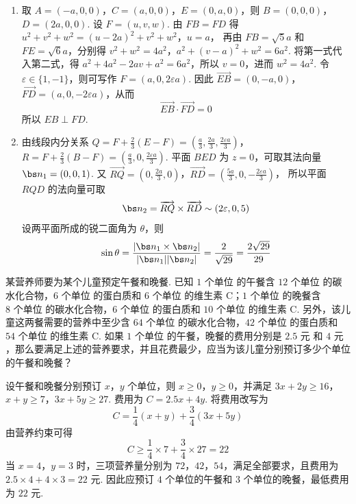 \begin{solution}
\begin{enumerate}
\item 取 \(A=(-a,0,0)\)，\(C=(a,0,0)\)，\(E=(0,a,0)\)，则 \(B=(0,0,0)\)，\(D=(2a,0,0)\). 设 \(F=(u,v,w)\). 由 \(FB=FD\) 得
\(u^2+v^2+w^2=(u-2a)^2+v^2+w^2\)，\(u=a\)，
再由 \(FB=\sqrt5a\) 和 \(FE=\sqrt6a\)，分别得
\(v^2+w^2=4a^2\)，\(a^2+(v-a)^2+w^2=6a^2\).
将第一式代入第二式，得 \(a^2+4a^2-2av+a^2=6a^2\)，所以 \(v=0\)，进而 \(w^2=4a^2\). 令 \(\varepsilon\in\{1,-1\}\)，则可写作 \(F=(a,0,2\varepsilon a)\). 因此 \(\overrightarrow{EB}=(0,-a,0)\)，\(\overrightarrow{FD}=(a,0,-2\varepsilon a)\)，从而
\[
\overrightarrow{EB}\cdot\overrightarrow{FD}=0
\]
所以 \(EB\perp FD\).
\item 由线段内分关系
\(Q=F+\frac23(E-F)=\left(\frac a3,\frac{2a}{3},\frac{2\varepsilon a}{3}\right)\)，\(R=F+\frac23(B-F)=\left(\frac a3,0,\frac{2\varepsilon a}{3}\right)\).
平面 \(BED\) 为 \(z=0\)，可取其法向量 \(\bs n_1=(0,0,1)\). 又
\(\overrightarrow{RQ}=(0,\tfrac{2a}{3},0)\)，\(\overrightarrow{RD}=(\tfrac{5a}{3},0,-\tfrac{2\varepsilon a}{3})\)，
所以平面 \(RQD\) 的法向量可取
\[
\bs n_2=\overrightarrow{RQ}\times\overrightarrow{RD}\sim(2\varepsilon,0,5)
\]
设两平面所成的锐二面角为 \(\theta\)，则
\[
\sin\theta=\frac{|\bs n_1\times\bs n_2|}{|\bs n_1||\bs n_2|}=\frac2{\sqrt{29}}=\frac{2\sqrt{29}}{29}
\]
\end{enumerate}
\end{solution}

\begin{problem}
某营养师要为某个儿童预定午餐和晚餐. 已知 \(1\text{ 个单位}\) 的午餐含 \(12\text{ 个单位}\) 的碳水化合物，\(6\text{ 个单位}\) 的蛋白质和 \(6\text{ 个单位}\) 的维生素 \(\mathrm C\)；\(1\text{ 个单位}\) 的晚餐含 \(8\text{ 个单位}\) 的碳水化合物，\(6\text{ 个单位}\) 的蛋白质和 \(10\text{ 个单位}\) 的维生素 \(\mathrm C\). 另外，该儿童这两餐需要的营养中至少含 \(64\text{ 个单位}\) 的碳水化合物，\(42\text{ 个单位}\) 的蛋白质和 \(54\text{ 个单位}\) 的维生素 \(\mathrm C\). 如果 \(1\text{ 个单位}\) 的午餐，晚餐的费用分别是 \(2.5\text{ 元}\) 和 \(4\text{ 元}\)，那么要满足上述的营养要求，并且花费最少，应当为该儿童分别预订多少个单位的午餐和晚餐？
\end{problem}

\begin{solution}
设午餐和晚餐分别预订 \(x\)，\(y\) 个单位，则 \(x\geqslant0\)，\(y\geqslant0\)，并满足
\(3x+2y\geqslant16\)，\(x+y\geqslant7\)，\(3x+5y\geqslant27\).
费用为 \(C=2.5x+4y\). 将费用改写为
\[
C=\frac14(x+y)+\frac34(3x+5y)
\]
由营养约束可得
\[
C\geqslant\frac14\times7+\frac34\times27=22
\]
当 \(x=4\)，\(y=3\) 时，三项营养量分别为 \(72\)，\(42\)，\(54\)，满足全部要求，且费用为 \(2.5\times4+4\times3=22\text{ 元}\). 因此应预订 \(4\) 个单位的午餐和 \(3\) 个单位的晚餐，最低费用为 \(22\text{ 元}\).
\end{solution}

